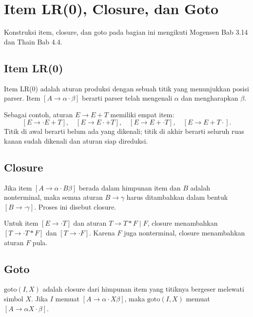 \section{Item LR(0), Closure, dan Goto}
\label{sec:ch12-item}

Konstruksi item, closure, dan goto pada bagian ini mengikuti Mogensen
Bab 3.14 dan Thain Bab 4.4.

\subsection{Item LR(0)}

\begin{definisi}[Item LR(0)]
Item LR(0) adalah aturan produksi dengan sebuah titik yang menunjukkan
posisi parser. Item \([A \to \alpha \cdot \beta]\) berarti parser
telah mengenali \(\alpha\) dan mengharapkan \(\beta\).
\end{definisi}

Sebagai contoh, aturan \(E \to E + T\) memiliki empat item:
\[
[E \to \cdot E + T],\quad
[E \to E \cdot + T],\quad
[E \to E + \cdot T],\quad
[E \to E + T \cdot].
\]
Titik di awal berarti belum ada yang dikenali; titik di akhir berarti
seluruh ruas kanan sudah dikenali dan aturan siap direduksi.

\subsection{Closure}

Jika item \([A \to \alpha \cdot B \beta]\) berada dalam himpunan
item dan \(B\) adalah nonterminal, maka semua aturan \(B \to \gamma\)
harus ditambahkan dalam bentuk \([B \to \cdot \gamma]\). Proses ini
disebut closure.

\begin{contoh}[Closure]
Untuk item \([E \to \cdot T]\) dan aturan
\(T \to T * F \mid F\), closure menambahkan
\([T \to \cdot T * F]\) dan \([T \to \cdot F]\). Karena \(F\)
juga nonterminal, closure menambahkan aturan \(F\) pula.
\end{contoh}

\subsection{Goto}

\(\text{goto}(I, X)\) adalah closure dari himpunan item yang titiknya
bergeser melewati simbol \(X\). Jika \(I\) memuat
\([A \to \alpha \cdot X \beta]\), maka
\(\text{goto}(I,X)\) memuat \([A \to \alpha X \cdot \beta]\).

